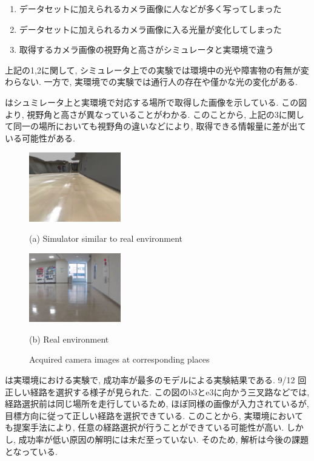 \begin{enumerate}
  \item データセットに加えられるカメラ画像に人などが多く写ってしまった
  \item データセットに加えられるカメラ画像に入る光量が変化してしまった
  \item 取得するカメラ画像の視野角と高さがシミュレータと実環境で違う
\end{enumerate}

上記の1,2に関して, シミュレータ上での実験では環境中の光や障害物の有無が変わらない. 一方で, 実環境での実験では通行人の存在や僅かな光の変化がある. 
\par
{}はシュミレータ上と実環境で対応する場所で取得した画像を示している. この図より, 視野角と高さが異なっていることがわかる. このことから, 上記の3に関して同一の場所においても視野角の違いなどにより, 取得できる情報量に差が出ている可能性がある.

\begin{figure}[h]
  \centering
  \begin{minipage}[b]{67mm}
    \centering
    \includegraphics[width=40mm]{images/horizonal_sim.png}
    \caption*{(a) Simulator similar to real environment}
  \end{minipage} 
  \begin{minipage}[b]{67mm}
    \centering
    \includegraphics[width=40mm]{images/horizonal_real.png}
    \caption*{(b) Real environment}
  \end{minipage}
  \caption{Acquired camera images at corresponding places}
  \label{Fig:horizonal}
\end{figure}

は実環境における実験で, 成功率が最多のモデルによる実験結果である. 9/12 回正しい経路を選択する様子が見られた. この図のb3とe3に向かう三叉路などでは, 経路選択前は同じ場所を走行しているため, ほぼ同様の画像が入力されているが, 目標方向に従って正しい経路を選択できている. このことから, 実環境においても提案手法により, 任意の経路選択が行うことができている可能性が高い.
しかし, 成功率が低い原因の解明には未だ至っていない. そのため, 解析は今後の課題となっている.


